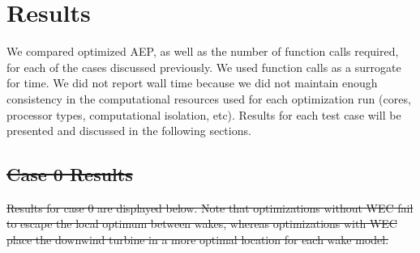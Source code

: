 \documentclass[a4paper]{jpconf}
\providecommand{\DIFdel}[1]{{\protect\color{red}\sout{#1}}}                      %
\providecommand{\DIFdelbegin}{} %
\newcommand{\DIFscaledelfig}{0.5}
\newlength{\DIFdelgraphicswidth} %
\newlength{\DIFdelgraphicsheight} %
\newcommand{\DIFdelincludegraphics}[2][]{%
\sbox{\DIFdelgraphicsbox}{\DIFOincludegraphics[#1]{#2}}%
\settoboxwidth{\DIFdelgraphicswidth}{\DIFdelgraphicsbox} %
\settoboxtotalheight{\DIFdelgraphicsheight}{\DIFdelgraphicsbox} %
\scalebox{\DIFscaledelfig}{%
\parbox[b]{\DIFdelgraphicswidth}{\usebox{\DIFdelgraphicsbox}\\[-\baselineskip] \rule{\DIFdelgraphicswidth}{0em}}\llap{\resizebox{\DIFdelgraphicswidth}{\DIFdelgraphicsheight}{%
\setlength{\unitlength}{\DIFdelgraphicswidth}%
\begin{picture}(1,1)%
\thicklines\linethickness{2pt} %
{\color[rgb]{1,0,0}\put(0,0){\framebox(1,1){}}}%
{\color[rgb]{1,0,0}\put(0,0){\line( 1,1){1}}}%
{\color[rgb]{1,0,0}\put(0,1){\line(1,-1){1}}}%
\end{picture}%
}\hspace*{3pt}}} %
} %
\DeclareRobustCommand{\DIFdelbegin}{\DIFOdelbegin \let\includegraphics\DIFdelincludegraphics} %
\begin{document}
\section{Results}\label{sec:results}
We compared optimized AEP, as well as the number of function calls required, for each of the cases discussed previously. We used function calls as a surrogate for time. We did not report wall time because we did not maintain enough consistency in the computational resources used for each optimization run (cores, processor types, computational isolation, etc). Results for each test case will be presented and discussed in the following sections.



\DIFdelbegin \subsection{\DIFdel{Case 0 Results}}
\addtocounter{subsection}{-1}%
\DIFdel{Results for case 0 are displayed below. Note that optimizations without WEC fail to escape the local optimum between wakes, whereas optimizations with WEC place the downwind turbine in a more optimal location for each wake model.
}%
\end{document}
